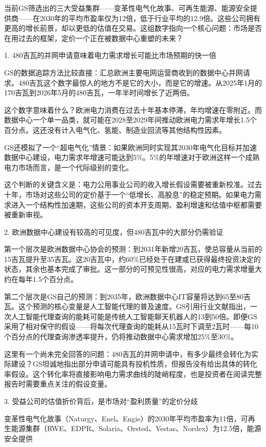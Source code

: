 \documentclass[11pt]{ctexart}
\begin{document}
当前GS筛选出的三大受益集群——变革性电气化故事、可再生能源、能源安全提供商——在2030年的平均市盈率仅为12倍，低于行业平均的12.9倍。这些公司拥有更高的增长前景，却以更低的估值在交易。这组数字指向一个核心问题：市场是否在用过去的框架，定价一个正在被数据中心重塑的未来？

1. 480吉瓦的并网申请意味着电力需求增长可能比市场预期的快一倍

GS的数据追踪方法比较直接：汇总欧洲主要电网运营商收到的数据中心并网请求。480吉瓦这个数字最惊人的地方不是它的大小，而是它的增速。从2025年1月的170吉瓦到2026年5月的480吉瓦，一年半时间增长了近两倍。

这个数字意味着什么？欧洲电力消费在过去十年基本停滞，年均增速在零附近。而数据中心一个单一品类，就可能在2028至2029年间推动欧洲电力需求年增长1.5个百分点。这还没有计入电气化、氢能、制造业回流等其他结构性因素。

GS还模拟了一个“超电气化”情景：如果欧洲同时实现其2030年电气化目标并加速数据中心建设，电力需求年增速可能达到5\%。5\%的年增速对于欧洲这样一个成熟电力市场而言，是一个代际级别的变化。

这个判断的关键含义是：电力公用事业公司的收入增长假设需要被重新校准。过去十年，市场对这些公司的定价基于一个“低增长、高股息”的稳定预期。如果电力需求进入一个结构性加速期，这些公司的资本开支周期、盈利增速和估值中枢都需要被重新审视。

2. 欧洲数据中心建设有较高的可见度，但480吉瓦中的大部分仍需验证

第一个层次是欧洲数据中心协会的预测：到2031年新增20吉瓦，使总容量从当前的15吉瓦提升至35吉瓦。这20吉瓦中，约60\%已经处于在建或已获得最终投资决定的状态，其余也基本完成了审批。这一部分的可预见性很高，对应的电力需求增量大约在每年1.5个百分点。

第二个层次是GS自己的预测：到2035年，欧洲数据中心IT容量将达到65至80吉瓦。这个预测的核心变量是人工智能代理的普及速度。GS引用行业文献指出，一次人工智能代理查询的能耗可能是传统人工智能聊天机器人的13到50倍。即便GS采用了相对保守的假设——将每次代理查询的能耗从15瓦时下调至2瓦时——每10个百分点的代理查询渗透率提升，仍将推动数据中心需求增加25\%至30\%。

这里有一个尚未完全回答的问题：480吉瓦的并网申请中，有多少最终会转化为实际建设？GS坦诚地指出部分申请可能具有投机性质，但报告没有给出具体的转化率假设。这个转化率将直接影响电力需求曲线的陡峭程度，也是投资者在阅读完整报告时需要重点关注的假设变量。

3. 受益公司的估值折价背后，是市场对“盈利质量”的定价分歧

变革性电气化故事（Naturgy、Enel、Engie）的2030年平均市盈率为11倍，可再生能源集群（RWE、EDPR、Solaria、Orsted、Vestas、Nordex）为12.5倍，能源安全提供
\end{document}
